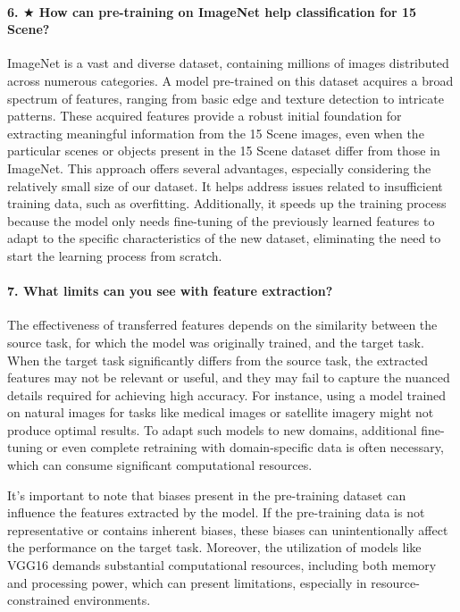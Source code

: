 \paragraph{6. $\bigstar$ How can pre-training on ImageNet help classification for 15 Scene?}
ImageNet is a vast and diverse dataset, containing millions of images distributed across numerous categories. A model pre-trained on this dataset acquires a broad spectrum of features, ranging from basic edge and texture detection to intricate patterns. These acquired features provide a robust initial foundation for extracting meaningful information from the 15 Scene images, even when the particular scenes or objects present in the 15 Scene dataset differ from those in ImageNet. This approach offers several advantages, especially considering the relatively small size of our dataset. It helps address issues related to insufficient training data, such as overfitting. Additionally, it speeds up the training process because the model only needs fine-tuning of the previously learned features to adapt to the specific characteristics of the new dataset, eliminating the need to start the learning process from scratch.

\paragraph{7. What limits can you see with feature extraction?}
The effectiveness of transferred features depends on the similarity between the source task, for which the model was originally trained, and the target task. When the target task significantly differs from the source task, the extracted features may not be relevant or useful, and they may fail to capture the nuanced details required for achieving high accuracy. For instance, using a model trained on natural images for tasks like medical images or satellite imagery might not produce optimal results. To adapt such models to new domains, additional fine-tuning or even complete retraining with domain-specific data is often necessary, which can consume significant computational resources.

It's important to note that biases present in the pre-training dataset can influence the features extracted by the model. If the pre-training data is not representative or contains inherent biases, these biases can unintentionally affect the performance on the target task. Moreover, the utilization of models like VGG16 demands substantial computational resources, including both memory and processing power, which can present limitations, especially in resource-constrained environments.

